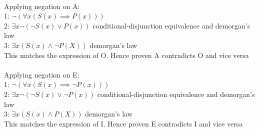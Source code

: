 \documentclass[a4paper]{exam}
\begin{document}
\begin{questions}
\begin{parts}
  \begin{solution}\\
    Applying negation on A: \\
    1: $\neg (\forall x (S(x) \implies P(x)))$\\
    2: $\exists x \neg(\neg S(x) \lor P(x))$ conditional-disjunction equivalence and demorgan's law \\
    3: $\exists x (S(x) \land \neg P(X))$ demorgan's law\\
    This matches the expression of O. Hence proven A contradicts O and vice versa\\\\
    Applying negation on E:\\
    1: $\neg (\forall x (S(x) \implies \neg P(x)))$\\
    2: $\exists x \neg(\neg S(x) \lor \neg P(x))$ conditional-disjunction equivalence and demorgan's law\\
    3: $\exists x (S(x) \land P(X))$ demorgan's law \\
    This matches the expression of I. Hence proven E contradicts I and vice versa
  \end{solution}
  \end{parts}
  
\end{questions}
\end{document}
